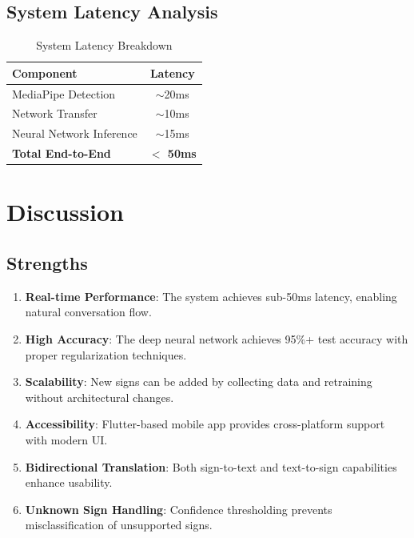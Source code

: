 \documentclass[conference]{IEEEtran}
\begin{document}
\subsection{System Latency Analysis}

\begin{table}[htbp]
\caption{System Latency Breakdown}
\label{tab:latency}
\centering
\begin{tabular}{|l|c|}
\hline
\textbf{Component} & \textbf{Latency} \\
\hline
MediaPipe Detection & $\sim$20ms \\
Network Transfer & $\sim$10ms \\
Neural Network Inference & $\sim$15ms \\
\hline
\textbf{Total End-to-End} & \textbf{$<$ 50ms} \\
\hline
\end{tabular}
\end{table}

\section{Discussion}

\subsection{Strengths}

\begin{enumerate}
    \item \textbf{Real-time Performance}: The system achieves sub-50ms latency, enabling natural conversation flow.
    \item \textbf{High Accuracy}: The deep neural network achieves 95\%+ test accuracy with proper regularization techniques.
    \item \textbf{Scalability}: New signs can be added by collecting data and retraining without architectural changes.
    \item \textbf{Accessibility}: Flutter-based mobile app provides cross-platform support with modern UI.
    \item \textbf{Bidirectional Translation}: Both sign-to-text and text-to-sign capabilities enhance usability.
    \item \textbf{Unknown Sign Handling}: Confidence thresholding prevents misclassification of unsupported signs.
\end{enumerate}
\end{document}
